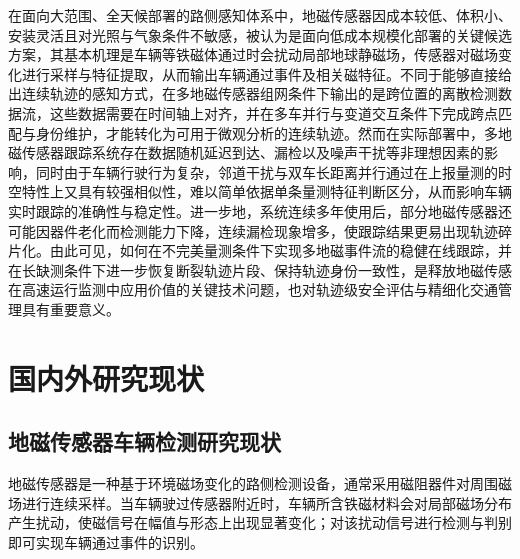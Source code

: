 \documentclass{xdupgthesis}
\begin{document}
在面向大范围、全天候部署的路侧感知体系中，地磁传感器因成本较低、体积小、安装灵活且对光照与气象条件不敏感，被认为是面向低成本规模化部署的关键候选方案，其基本机理是车辆等铁磁体通过时会扰动局部地球静磁场，传感器对磁场变化进行采样与特征提取，从而输出车辆通过事件及相关磁特征\cite{culik2023wirelessmagnetic}。不同于能够直接给出连续轨迹的感知方式，在多地磁传感器组网条件下输出的是跨位置的离散检测数据流，这些数据需要在时间轴上对齐，并在多车并行与变道交互条件下完成跨点匹配与身份维护，才能转化为可用于微观分析的连续轨迹。然而在实际部署中，多地磁传感器跟踪系统存在数据随机延迟到达、漏检以及噪声干扰等非理想因素的影响，同时由于车辆行驶行为复杂，邻道干扰与双车长距离并行通过在上报量测的时空特性上又具有较强相似性，难以简单依据单条量测特征判断区分，从而影响车辆实时跟踪的准确性与稳定性。进一步地，系统连续多年使用后，部分地磁传感器还可能因器件老化而检测能力下降，连续漏检现象增多，使跟踪结果更易出现轨迹碎片化\cite{rakai2022dataassociation,feng2021magneticdataassociation,wang2023distributedmagnetic}。由此可见，如何在不完美量测条件下实现多地磁事件流的稳健在线跟踪，并在长缺测条件下进一步恢复断裂轨迹片段、保持轨迹身份一致性，是释放地磁传感在高速运行监测中应用价值的关键技术问题，也对轨迹级安全评估与精细化交通管理具有重要意义。

\section{国内外研究现状}

\subsection{地磁传感器车辆检测研究现状}
地磁传感器是一种基于环境磁场变化的路侧检测设备，通常采用磁阻器件对周围磁场进行连续采样。当车辆驶过传感器附近时，车辆所含铁磁材料会对局部磁场分布产生扰动，使磁信号在幅值与形态上出现显著变化；对该扰动信号进行检测与判别即可实现车辆通过事件的识别\cite{balid2018intelligent,feng2022magmonitor}。
\end{document}
